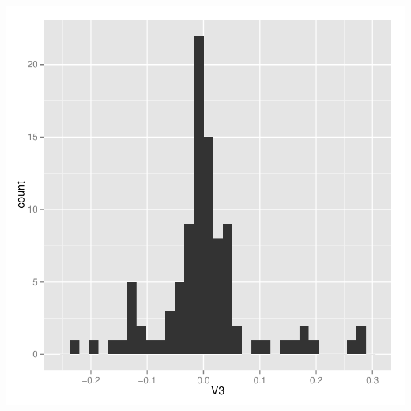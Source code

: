 \documentclass{article}
\begin{document}
\begin{center}
\includegraphics{Masterpiece-007}

\end{center}
\end{document}
